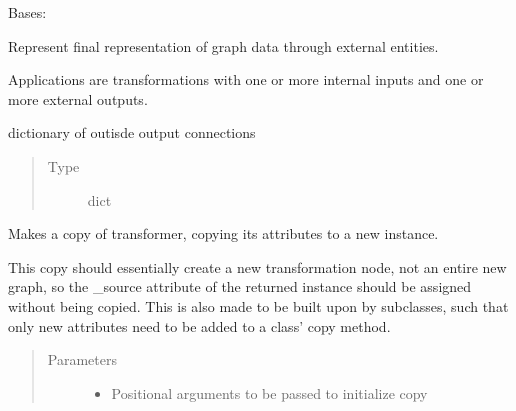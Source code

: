 \documentclass[letterpaper,10pt,english]{sphinxmanual}
\begin{document}
\begin{fulllineitems}
\label{\detokenize{dalio.application:dalio.application.application.Application}}
Bases: {\hyperref[\detokenize{dalio.model:dalio.model.model.Model}]{}}

Represent final representation of graph data through external entities.

Applications are transformations with one or more internal inputs and one
or more external outputs.

\begin{fulllineitems}
\label{\detokenize{dalio.application:dalio.application.application.Application._out}}
dictionary of outisde output connections
\begin{quote}\begin{description}
\item[{Type}] \leavevmode
dict

\end{description}\end{quote}

\end{fulllineitems}


\begin{fulllineitems}
\label{\detokenize{dalio.application:dalio.application.application.Application.copy}}
Makes a copy of transformer, copying its attributes to a new
instance.

This copy should essentially create a new transformation node, not an
entire new graph, so the \_source attribute of the returned instance
should be assigned without being copied. This is also made to be built
upon by subclasses, such that only new attributes need to be added to
a class’ copy method.
\begin{quote}\begin{description}
\item[{Parameters}] \leavevmode\begin{itemize}
\item {} 
 \textendash{} Positional arguments to be passed to initialize copy


\end{itemize}
\end{description}
\end{quote}
\end{fulllineitems}
\end{fulllineitems}
\end{document}
